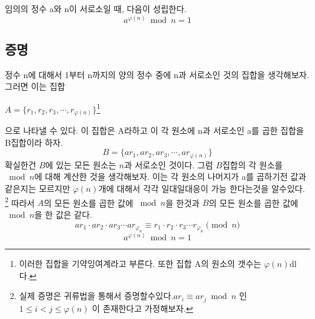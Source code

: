 \begin{justbox}
임의의 정수 a와 n이 서로소일 때, 다음이 성립한다.
\[a^{\varphi(n)} \bmod n = 1\]
\end{justbox}

\subsection{증명}
정수 n에 대해서 1부터 n까지의 양의 정수 중에 n과 서로소인 것의 집합을 생각해보자.
그러면 이는 집합
\begin{center}
    $A = \{ r_1 ,r_2,r_3, \cdots ,r_{\varphi(n)}\}$\footnote{이러한 집합을 기약잉여계라고 부른다. 또한 집합 A의 원소의 갯수는 $\varphi(n)$dl다.}
\end{center}
으로 나타낼 수 있다. 이 집합은 A라하고 이 각 원소에 n과 서로소인 a를 곱한 집합을 B집합이라 하자.
\[B = \{ ar_1 ,ar_2,ar_3, \cdots ,ar_{\varphi(n)}\} \]
확실한건 $B$에 있는 모든 원소는 $n$과 서로소인 것이다. 
그럼 $B$집합의 각 원소를 $\bmod n$에 대해 계산한 것을 생각해보자.
 이는 각 원소의 나머지가 a를 곱하기전 값과 같은지는 모르지만 $\varphi(n)$개에 대해서 각각 일대일대응이 가능 한다는것을 알수있다.
  \footnote{실제 증명은 귀류법을 통해서 증명할수있다.$ar_i  \equiv ar_j \bmod n $ 인 $1 \le i < j \le \varphi(n)$ 이 존재한다고 가정해보자.}
따라서 $A$의 모든 원소를 곱한 값에 $\bmod n$을 한것과 $B$의 모든 원소를 곱한 값에 $\bmod n$을 한 값은 같다.
\[ar_1 \cdot ar_2 \cdot ar_3 \cdots ar_{\varphi_{n}} \equiv r_1 \cdot r_2 \cdot r_3 \cdots r_{\varphi_{n}} \pmod n\]
\[a^{\varphi(n)}\bmod n= 1\]

